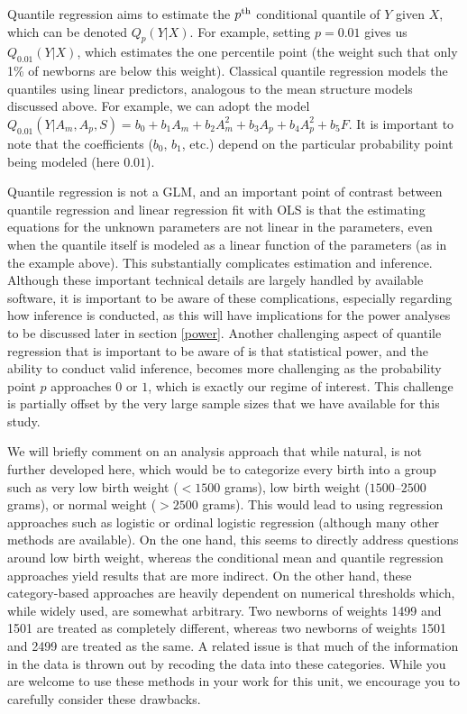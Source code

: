 Quantile regression aims to estimate the $p^{\rm th}$ conditional quantile of $Y$ given $X$, which can be denoted $Q_p(Y|X)$.  For example, setting $p=0.01$ gives us $Q_{0.01}(Y|X)$, which estimates the one percentile point (the weight such that only 1\% of newborns are below this weight).  Classical quantile regression models the quantiles using linear predictors, analogous to the mean structure models discussed above.  For example, we can adopt the model $Q_{0.01}(Y|A_m, A_p, S) = b_0 + b_1 A_m + b_2 A_m^2 + b_3A_p + b_4A_p^2 + b_5F$.  It is important to note that the coefficients ($b_0$, $b_1$, etc.) depend on the particular probability point being modeled (here $0.01$).

Quantile regression is not a GLM, and an important point of contrast between quantile regression and linear regression fit with OLS is that the estimating equations for the unknown parameters are not linear in the parameters, even when the quantile itself is modeled as a linear function of the parameters (as in the example above).  This substantially complicates estimation and inference.  Although these important technical details are largely handled by available software, it is important to be aware of these complications, especially regarding how inference is conducted, as this will have implications for the power analyses to be discussed later in section \ref{power}.  Another challenging aspect of quantile regression that is important to be aware of is that statistical power, and the ability to conduct valid inference, becomes more challenging as the probability point $p$ approaches $0$ or $1$, which is exactly our regime of interest.  This challenge is partially offset by the very large sample sizes that we have available for this study.

We will briefly comment on an analysis approach that while natural, is not further developed here, which would be to categorize every birth into a group such as very low birth weight ($<1500$ grams), low birth weight ($1500$--$2500$ grams), or normal weight ($>2500$ grams).  This would lead to using regression approaches such as logistic or ordinal logistic regression (although many other methods are available).  On the one hand, this seems to directly address questions around low birth weight, whereas the conditional mean and quantile regression approaches yield results that are more indirect.  On the other hand, these category-based approaches are heavily dependent on numerical thresholds which, while widely used, are somewhat arbitrary.  Two newborns of weights 1499 and 1501 are treated as completely different, whereas two newborns of weights 1501 and 2499 are treated as the same.  A related issue is that much of the information in the data is thrown out by recoding the data into these categories.  While you are welcome to use these methods in your work for this unit, we encourage you to carefully consider these drawbacks.


